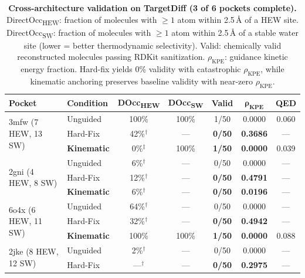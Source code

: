 \documentclass{article}
\begin{document}
\begin{table}[H]
  \centering
  \caption{\textbf{Cross-architecture validation on TargetDiff (3 of 6 pockets
    complete).}
    DirectOcc\textsubscript{HEW}: fraction of molecules with $\ge 1$
    atom within 2.5\,\AA{} of a HEW site.
    DirectOcc\textsubscript{SW}: fraction of molecules with $\ge 1$
    atom within 2.5\,\AA{} of a stable water site (lower = better
    thermodynamic selectivity).  Valid: chemically valid reconstructed
    molecules passing RDKit sanitization.  $\rho_{\text{KPE}}$: guidance
    kinetic energy fraction.  Hard-fix yields 0\% validity with catastrophic
    $\rho_{\text{KPE}}$, while kinematic anchoring preserves baseline validity
    with near-zero $\rho_{\text{KPE}}$.}
  \label{tab:targetdiff}
  \small
  \begin{tabular}{l l c c c c c}
    \toprule
    \textbf{Pocket} & \textbf{Condition} & \textbf{DOcc\textsubscript{HEW}}
    & \textbf{DOcc\textsubscript{SW}} & \textbf{Valid} & $\bm{\rho_{\text{KPE}}}$
    & \textbf{QED} \\
    \midrule
    \multirow{3}{*}{3mfw (7 HEW, 13 SW)}
      & Unguided    & 100\% & 100\% & 1/50 & 0.0000 & 0.060 \\
      & Hard-Fix    & 42\%$^\dagger$ & --- & \textbf{0/50} & \textbf{0.3686} & --- \\
      & \textbf{Kinematic} & 0\%$^\ddagger$ & 100\% & \textbf{1/50} & \textbf{0.0000} & 0.039 \\
    \midrule
    \multirow{3}{*}{2gni (4 HEW, 8 SW)}
      & Unguided    & 6\%$^\dagger$ & --- & 0/50 & 0.0000 & --- \\
      & Hard-Fix    & 12\%$^\dagger$ & --- & \textbf{0/50} & \textbf{0.4791} & --- \\
      & \textbf{Kinematic} & 6\%$^\dagger$ & --- & \textbf{0/50} & \textbf{0.0196} & --- \\
    \midrule
    \multirow{3}{*}{6o4x (6 HEW, 11 SW)}
      & Unguided    & 64\%$^\dagger$ & --- & 0/50 & 0.0000 & --- \\
      & Hard-Fix    & 32\%$^\dagger$ & --- & \textbf{0/50} & \textbf{0.4942} & --- \\
      & \textbf{Kinematic} & 100\% & 100\% & \textbf{1/50} & \textbf{0.0000} & 0.088 \\
    \midrule
    \multirow{3}{*}{2jke (8 HEW, 12 SW)}
      & Unguided    & 2\%$^\dagger$ & --- & 0/50 & 0.0000 & --- \\
      & Hard-Fix    & ---$^\dagger$ & --- & \textbf{0/50} & \textbf{0.2975} & --- \\

\end{tabular}
\end{table}
\end{document}

